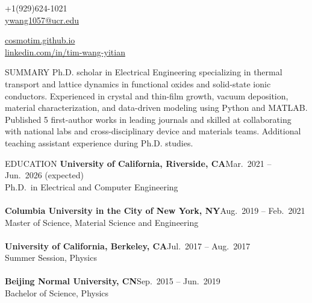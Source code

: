 \documentclass{resume} %
\begin{document}
\vspace{-1em}
\noindent
\begin{minipage}[t]{0.5\textwidth}
\raggedright
+1(929)624-1021 \\
\href{mailto:ywang1057@ucr.edu}{ywang1057@ucr.edu}
\end{minipage}%
\begin{minipage}[t]{0.5\textwidth}
\raggedleft
\href{http://cosmotim.github.io}{cosmotim.github.io} \\
\href{http://linkedin.com/in/tim-wang-yitian/}{linkedin.com/in/tim-wang-yitian}
\end{minipage}
\vspace{0.5em}


\begin{rSection}{SUMMARY}
Ph.D. scholar in Electrical Engineering specializing in thermal transport and lattice dynamics in functional oxides and solid-state ionic conductors.
Experienced in crystal and thin-film growth, vacuum deposition, material characterization, and data-driven modeling using Python and MATLAB.
Published 5 first-author works in leading journals and skilled at collaborating with national labs and cross-disciplinary device and materials teams.
Additional teaching assistant experience during Ph.D. studies.
\end{rSection}


\begin{rSection}{EDUCATION}
{\bf University of California, Riverside, CA}\hfill{Mar.\ 2021 -- Jun.\ 2026 (expected)}
\\ Ph.D.\ in Electrical and Computer Engineering
\\
\\{\bf Columbia University in the City of New York, NY}\hfill{Aug.\ 2019 -- Feb.\ 2021}
\\ Master of Science, Material Science and Engineering
\\
\\{\bf University of California, Berkeley, CA}\hfill{Jul.\ 2017 -- Aug.\ 2017}
\\ Summer Session, Physics
\\
\\{\bf Beijing Normal University, CN}\hfill{Sep.\ 2015 -- Jun.\ 2019}
\\ Bachelor of Science, Physics

\end{rSection}
\end{document}
